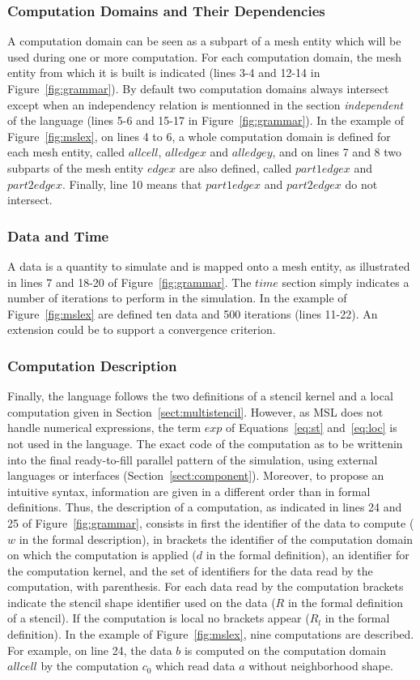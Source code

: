 \subsubsection*{Computation Domains and Their Dependencies}
A computation domain can be seen as a subpart of a mesh entity which will be used during one or more computation. For each computation domain, the mesh entity from which it is built is indicated (lines 3-4 and 12-14 in Figure~\ref{fig:grammar}). By default two computation domains always intersect except when an independency relation is mentionned in the section \emph{independent} of the language (lines 5-6 and 15-17 in Figure~\ref{fig:grammar}). In the example of Figure~\ref{fig:mslex}, on lines 4 to 6, a whole computation domain is defined for each mesh entity, called $allcell$, $alledgex$ and $alledgey$, and on lines 7 and 8 two subparts of the mesh entity $edgex$ are also defined, called $part1edgex$ and $part2edgex$. Finally, line 10 means that $part1edgex$ and $part2edgex$ do not intersect.

\subsubsection*{Data and Time}
A data is a quantity to simulate and is mapped onto a mesh entity, as illustrated in lines 7 and 18-20 of Figure~\ref{fig:grammar}. The $time$ section simply indicates a number of iterations to perform in the simulation. In the example of Figure~\ref{fig:mslex} are defined ten data and 500 iterations (lines 11-22). An extension could be to support a convergence criterion.

\subsubsection*{Computation Description}
Finally, the language follows the two definitions of a stencil kernel and a local computation given in Section~\ref{sect:multistencil}. However, as MSL does not handle numerical expressions, the term $exp$ of Equations~\ref{eq:st} and~\ref{eq:loc} is not used in the language. The exact code of the computation as to be writtenin into the final ready-to-fill parallel pattern of the simulation, using external languages or interfaces (\cf Section~\ref{sect:component}). Moreover, to propose an intuitive syntax, information are given in a different order than in formal definitions.
Thus, the description of a computation, as indicated in lines 24 and 25 of Figure~\ref{fig:grammar}, consists in first the identifier of the data to compute ($w$ in the formal description), in brackets the identifier of the computation domain on which the computation is applied ($d$ in the formal definition), an identifier for the computation kernel, and the set of identifiers for the data read by the computation, with parenthesis. For each data read by the computation brackets indicate the stencil shape identifier used on the data ($R$ in the formal definition of a stencil). If the computation is local no brackets appear ($R_l$ in the formal definition). In the example of Figure~\ref{fig:mslex}, nine computations are described. For example, on line 24, the data $b$ is computed on the computation domain $allcell$ by the computation $c_0$ which read data $a$ without neighborhood shape.

